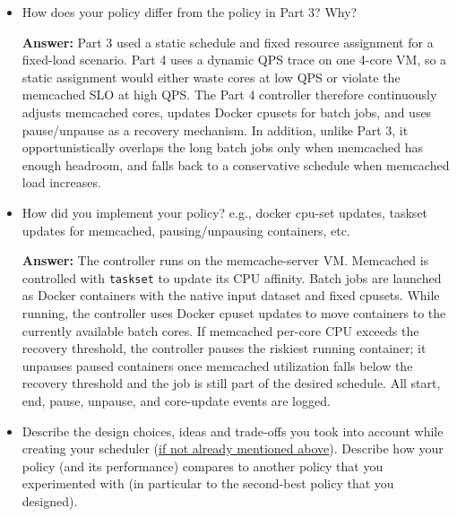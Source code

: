 \begin{enumerate}
\begin{itemize}
    \textbf{Why:}
    The policy prioritizes  and  because they are the longest critical-path jobs, so delaying them increases makespan.  is started as a companion when enough memcached headroom exists, but it is blocked when memcached needs 3 cores. Among short jobs,  and  are scheduled early because they are safer for memcached, while  and  are more CPU/L1i-risky and are therefore scheduled later or paused under pressure.

\item How does your policy differ from the policy in Part 3? Why?

\textbf{Answer:} Part 3 used a static schedule and fixed resource assignment for a fixed-load scenario. Part 4 uses a dynamic QPS trace on one 4-core VM, so a static assignment would either waste cores at low QPS or violate the memcached SLO at high QPS. The Part 4 controller therefore continuously adjusts memcached cores, updates Docker cpusets for batch jobs, and uses pause/unpause as a recovery mechanism. In addition, unlike Part 3, it opportunistically overlaps the long batch jobs only when memcached has enough headroom, and falls back to a conservative schedule when memcached load increases.


\item How did you implement your policy? e.g., docker cpu-set updates, taskset updates for memcached, pausing/unpausing containers, etc.

\textbf{Answer:} The controller runs on the memcache-server VM. Memcached is controlled with \texttt{taskset} to update its CPU affinity. Batch jobs are launched as Docker containers with the native input dataset and fixed cpusets. While running, the controller uses Docker cpuset updates to move containers to the currently available batch cores. If memcached per-core CPU exceeds the recovery threshold, the controller pauses the riskiest running container; it unpauses paused containers once memcached utilization falls below the recovery threshold and the job is still part of the desired schedule. All start, end, pause, unpause, and core-update events are logged.

\item Describe the design choices, ideas and trade-offs you took into account while creating your scheduler (\underline{if not already mentioned above}). Describe how your policy (and its performance) compares to another policy that you experimented with (in particular to the second-best policy that you designed).


\end{itemize}
\end{enumerate}
